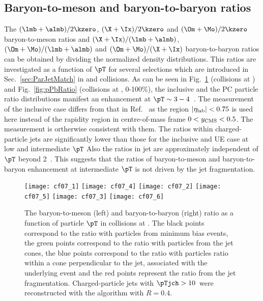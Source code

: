 \documentclass[ALICE,manyauthors]{cernphprep}
\begin{document}
\clearpage
\subsection{Baryon-to-meson and baryon-to-baryon ratios}
\label{subsec:ParRatios}
The $(\lmb + \almb)/2\kzero$, $(\X + \Ix)/2\kzero$ and $(\Om + \Mo)/2\kzero$ baryon-to-meson ratios and $(\X + \Ix)/(\lmb + \almb)$, $(\Om + \Mo)/(\lmb + \almb)$ and $(\Om + \Mo)/(\X + \Ix)$ baryon-to-baryon ratios can be obtained by dividing the normalized density distributions.
This ratios are investigated as a function of $\pT$ for several selections which are introduced in Sec.~\ref{sec:ParJetMatch} in \pp and \pPb collisions.
As can be seen in Fig.~\ref{fig:ppRatio} (\pp collisions at \thirteen) and Fig.~\ref{fig:pPbRatio} (\pPb collisions at \fivenn, 0-100\%), the inclusive and the PC particle ratio distributions manifest an enhancement at $\pT \sim 3 - 4 $~\GeVc.
The measurement of the inclusive case differs from that in Ref.~\cite{ALICE:2015mpp, ALICE:2016dei, ALICE:2013wgn} as the region $|\eta_{\rm lab}| < 0.75$ is used here instead of the rapidity region in centre-of-mass frame $0 < y_{\rm CMS} < 0.5$. 
The measurement is ortherwise consistent with them.
The ratios within charged-particle jets are significantly lower than those for the inclusive and UE case at low and intermediate $\pT$ 
Also the ratios in jet are approximately independent of $\pT$ beyond 2~\GeVc.
This suggests that the ratios of baryon-to-meson and baryon-to-baryon enhancement at intermediate $\pT$ is not driven by the jet fragmentation.
\begin{figure}[!ht]
	\begin{center}
		\texttt{[image: cf07\_1]}
		\texttt{[image: cf07\_4]}
		\texttt{[image: cf07\_2]}
		\texttt{[image: cf07\_5]}
		\texttt{[image: cf07\_3]}
		\texttt{[image: cf07\_6]}
	\end{center}
	\caption{The baryon-to-meson (left) and baryon-to-baryon (right) ratio as a function of particle $\pT$ in \pp collisions at \thirteen. The black points correspond to the ratio with particles from minimum bias events, the green points correspond to the ratio with particles from the jet cones, the blue points correspond to the ratio with particles ratio within a cone perpendicular to the jet, associated with the underlying event and the red points represent the ratio from the jet fragmentation. Charged-particle jets with $\pTjch > 10$~\GeVc were reconstructed with the \akT algorithm with $R = 0.4$.}
	\label{fig:ppRatio}
\end{figure}
\end{document}

